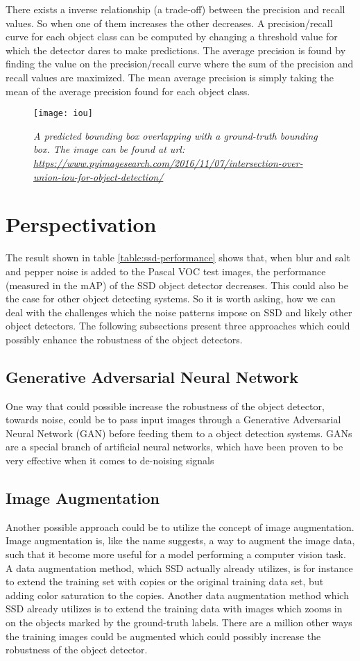 \documentclass{article}
\begin{document}
There exists a inverse relationship (a trade-off) between the precision and recall values. So when one of them increases the other decreases. A precision/recall curve for each object class can be computed by changing a threshold value for which the detector dares to make predictions. The average precision is found by finding the value on the precision/recall curve where the sum of the precision and recall values are maximized. The mean average precision is simply taking the mean of the average precision found for each object class.    

\begin{figure}[h]
\centering
\texttt{[image: iou]}
\caption{\textit{A predicted bounding box overlapping with a ground-truth bounding box. The image can be found at url: \url{https://www.pyimagesearch.com/2016/11/07/intersection-over-union-iou-for-object-detection/}}}
\label{fig:iou}     
\end{figure} 


\section{Perspectivation}
The result shown in table \ref{table:ssd-performance} shows that, when blur and salt and pepper noise is added to the Pascal VOC test images, the performance (measured in the mAP) of the SSD object detector decreases. This could also be the case for other object detecting systems. So it is worth asking, how we can deal with the challenges which the noise patterns impose on SSD and likely other object detectors. The following subsections present three approaches which could possibly enhance the robustness of the object detectors.   

\subsection{Generative Adversarial Neural Network}
One way that could possible increase the robustness of the object detector, towards noise, could be to pass input images through a Generative Adversarial Neural Network (GAN) before feeding them to a object detection systems. GANs are a special branch of artificial neural networks, which have been proven to be very effective when it comes to de-noising signals\cite{GAN}

\subsection{Image Augmentation}
Another possible approach could be to utilize the concept of image augmentation. Image augmentation is, like the name suggests, a way to augment the image data, such that it become more useful for a model performing a computer vision task. A data augmentation method, which SSD actually already utilizes, is for instance to extend the training set with copies or the original training data set, but adding color saturation to the copies. Another data augmentation method which SSD already utilizes is to extend the training data with images which zooms in on the objects marked by the ground-truth labels. There are a million other ways the training images could be augmented which could possibly increase the robustness of the object detector.  
\end{document}
